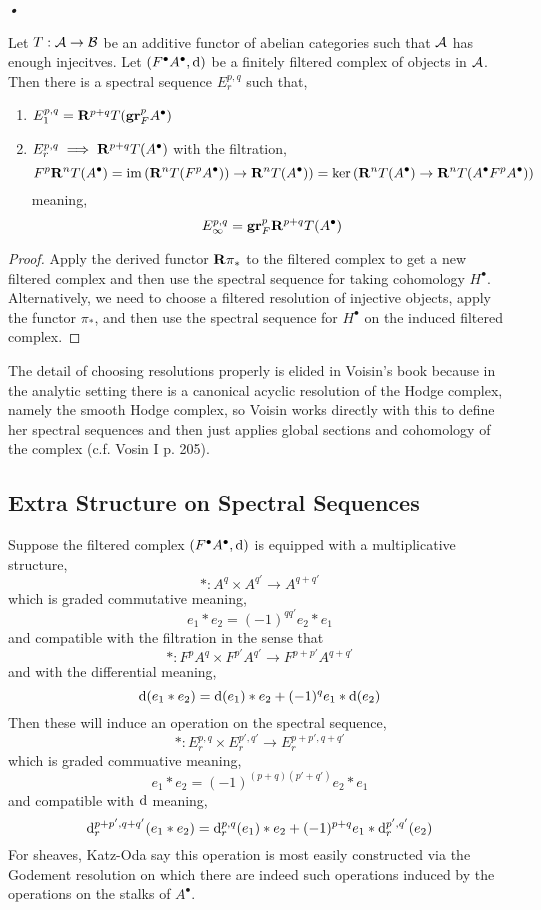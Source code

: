 \textit{•}\documentclass[12pt]{article}
\begin{document}
\begin{prop}
Let $T : \mathcal{A} \to \mathcal{B}$ be an additive functor of abelian categories such that $\mathcal{A}$ has enough injecitves. Let $(F^\bullet A^\bullet, \mathrm{d})$ be a finitely filtered complex of objects in $\mathcal{A}$. Then there is a spectral sequence $E_r^{p,q}$ such that,
\begin{enumerate}
\item $E^{p,q}_1 = \mathbf{R}^{p+q} T(\mathbf{gr}^p_F A^\bullet)$ 
\item $E^{p,q}_r \implies \mathbf{R}^{p+q} T(A^\bullet)$ with the filtration,
\[ F^p \mathbf{R}^n T(A^\bullet) = \operatorname{\mathrm{im}}{(\mathbf{R}^n T(F^p A^\bullet)) \to \mathbf{R}^n T(A^\bullet))} = \ker{(\mathbf{R}^n T(A^\bullet) \to \mathbf{R}^n T (A^\bullet F^p A^\bullet))} \]
meaning,
\[ E^{p,q}_{\infty} = \mathbf{gr}^p_F \mathbf{R}^{p+q} T(A^\bullet) \]
\end{enumerate}
\end{prop}

\begin{proof}
Apply the derived functor $\mathbf{R} \pi_*$ to the filtered complex to get a new filtered complex and then use the spectral sequence for taking cohomology $H^\bullet$. Alternatively, we need to choose a filtered resolution of injective objects, apply the functor $\pi_*$, and then use the spectral sequence for $H^\bullet$ on the induced filtered complex.
\end{proof}

\begin{rmk}
The detail of choosing resolutions properly is elided in Voisin's book because in the analytic setting there is a canonical acyclic resolution of the Hodge complex, namely the smooth Hodge complex, so Voisin works directly with this to define her spectral sequences and then just applies global sections and cohomology of the complex (c.f. Vosin I p. 205).
\end{rmk}

\subsection{Extra Structure on Spectral Sequences}

Suppose the filtered complex $(F^\bullet A^\bullet, \mathrm{d})$ is equipped with a multiplicative structure,
\[ * : A^{q} \times A^{q'} \to A^{q+q'} \]
which is graded commutative meaning,
\[ e_1 * e_2 = (-1)^{q q'} e_2 * e_1 \]
and compatible with the filtration in the sense that 
\[ * : F^{p} A^{q} \times F^{p'} A^{q'} \to F^{p + p'} A^{q + q'} \]
and with the differential meaning,
\[ \mathrm{d}(e_1 * e_2) = \mathrm{d}(e_1) * e_2 + (-1)^{q} e_1 * \mathrm{d}(e_2) \]
Then these will induce an operation on the spectral sequence,
\[ *:  E_r^{p, q} \times E_r^{p', q'} \to E_r^{p + p', q + q'} \]
which is graded commuative meaning,
\[ e_1 * e_2 = (-1)^{(p+q)(p' + q')} e_2 * e_1 \]
and compatible with $\mathrm{d}$ meaning,
\[ \mathrm{d}_r^{p + p', q + q'}(e_1 * e_2) = \mathrm{d}_r^{p,q}(e_1) * e_2 + (-1)^{p + q} e_1 * \mathrm{d}_r^{p', q'}(e_2) \]
For sheaves, Katz-Oda say this operation is most easily constructed via the Godement resolution on which there are indeed such operations induced by the operations on the stalks of $A^\bullet$. 
\end{document}
